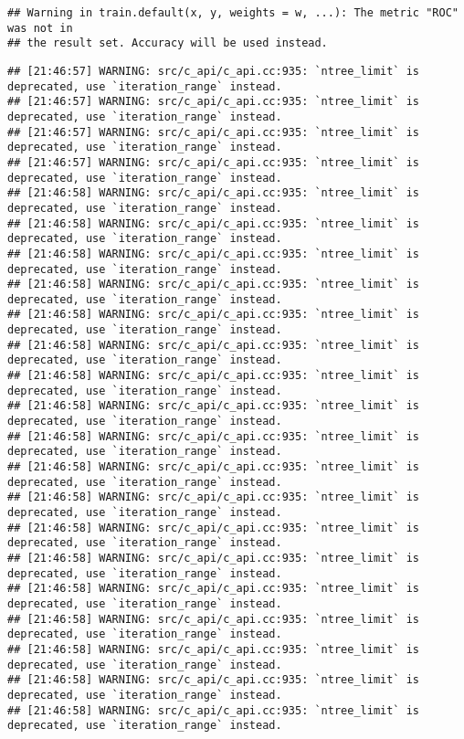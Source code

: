 \documentclass[
]{article}
\begin{document}
\begin{verbatim}
## Warning in train.default(x, y, weights = w, ...): The metric "ROC" was not in
## the result set. Accuracy will be used instead.
\end{verbatim}

\begin{verbatim}
## [21:46:57] WARNING: src/c_api/c_api.cc:935: `ntree_limit` is deprecated, use `iteration_range` instead.
## [21:46:57] WARNING: src/c_api/c_api.cc:935: `ntree_limit` is deprecated, use `iteration_range` instead.
## [21:46:57] WARNING: src/c_api/c_api.cc:935: `ntree_limit` is deprecated, use `iteration_range` instead.
## [21:46:57] WARNING: src/c_api/c_api.cc:935: `ntree_limit` is deprecated, use `iteration_range` instead.
## [21:46:58] WARNING: src/c_api/c_api.cc:935: `ntree_limit` is deprecated, use `iteration_range` instead.
## [21:46:58] WARNING: src/c_api/c_api.cc:935: `ntree_limit` is deprecated, use `iteration_range` instead.
## [21:46:58] WARNING: src/c_api/c_api.cc:935: `ntree_limit` is deprecated, use `iteration_range` instead.
## [21:46:58] WARNING: src/c_api/c_api.cc:935: `ntree_limit` is deprecated, use `iteration_range` instead.
## [21:46:58] WARNING: src/c_api/c_api.cc:935: `ntree_limit` is deprecated, use `iteration_range` instead.
## [21:46:58] WARNING: src/c_api/c_api.cc:935: `ntree_limit` is deprecated, use `iteration_range` instead.
## [21:46:58] WARNING: src/c_api/c_api.cc:935: `ntree_limit` is deprecated, use `iteration_range` instead.
## [21:46:58] WARNING: src/c_api/c_api.cc:935: `ntree_limit` is deprecated, use `iteration_range` instead.
## [21:46:58] WARNING: src/c_api/c_api.cc:935: `ntree_limit` is deprecated, use `iteration_range` instead.
## [21:46:58] WARNING: src/c_api/c_api.cc:935: `ntree_limit` is deprecated, use `iteration_range` instead.
## [21:46:58] WARNING: src/c_api/c_api.cc:935: `ntree_limit` is deprecated, use `iteration_range` instead.
## [21:46:58] WARNING: src/c_api/c_api.cc:935: `ntree_limit` is deprecated, use `iteration_range` instead.
## [21:46:58] WARNING: src/c_api/c_api.cc:935: `ntree_limit` is deprecated, use `iteration_range` instead.
## [21:46:58] WARNING: src/c_api/c_api.cc:935: `ntree_limit` is deprecated, use `iteration_range` instead.
## [21:46:58] WARNING: src/c_api/c_api.cc:935: `ntree_limit` is deprecated, use `iteration_range` instead.
## [21:46:58] WARNING: src/c_api/c_api.cc:935: `ntree_limit` is deprecated, use `iteration_range` instead.
## [21:46:58] WARNING: src/c_api/c_api.cc:935: `ntree_limit` is deprecated, use `iteration_range` instead.
## [21:46:58] WARNING: src/c_api/c_api.cc:935: `ntree_limit` is deprecated, use `iteration_range` instead.

\end{verbatim}
\end{document}
